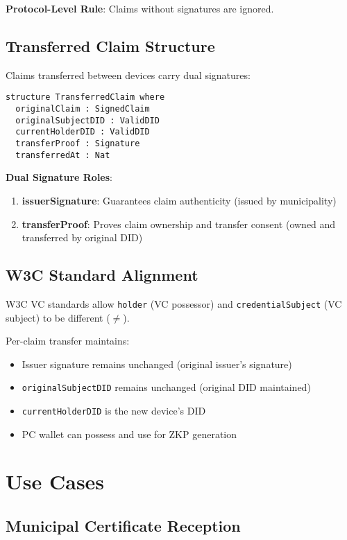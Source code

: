 \textbf{Protocol-Level Rule}: Claims without signatures are ignored.

\subsection{Transferred Claim Structure}

Claims transferred between devices carry dual signatures:

\begin{verbatim}
structure TransferredClaim where
  originalClaim : SignedClaim
  originalSubjectDID : ValidDID
  currentHolderDID : ValidDID
  transferProof : Signature
  transferredAt : Nat
\end{verbatim}

\textbf{Dual Signature Roles}:
\begin{enumerate}
  \item \textbf{issuerSignature}: Guarantees claim authenticity (issued by municipality)
  \item \textbf{transferProof}: Proves claim ownership and transfer consent (owned and transferred by original DID)
\end{enumerate}

\subsection{W3C Standard Alignment}

W3C VC standards allow \texttt{holder} (VC possessor) and \texttt{credentialSubject} (VC subject) to be different ($\neq$).

Per-claim transfer maintains:
\begin{itemize}
  \item Issuer signature remains unchanged (original issuer's signature)
  \item \texttt{originalSubjectDID} remains unchanged (original DID maintained)
  \item \texttt{currentHolderDID} is the new device's DID
  \item PC wallet can possess and use for ZKP generation
\end{itemize}

\section{Use Cases}

\subsection{Municipal Certificate Reception}

